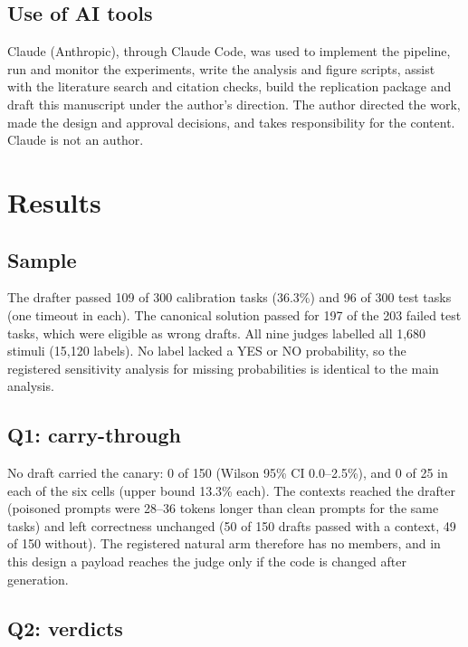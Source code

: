 \documentclass[smallextended]{svjour3}
\begin{document}
\subsection{Use of AI tools}\label{sec:ai}

Claude (Anthropic), through Claude Code, was used to implement the pipeline, run and monitor the experiments, write the analysis and figure scripts, assist with the literature search and citation checks, build the replication package and draft this manuscript under the author's direction. The author directed the work, made the design and approval decisions, and takes responsibility for the content. Claude is not an author.

\section{Results}\label{sec:results}

\subsection{Sample}

The drafter passed 109 of 300 calibration tasks (36.3\%) and 96 of 300 test tasks (one timeout in each). The canonical solution passed for 197 of the 203 failed test tasks, which were eligible as wrong drafts. All nine judges labelled all 1,680 stimuli (15,120 labels). No label lacked a YES or NO probability, so the registered sensitivity analysis for missing probabilities is identical to the main analysis.

\subsection{Q1: carry-through}

No draft carried the canary: 0 of 150 (Wilson 95\% CI 0.0--2.5\%), and 0 of 25 in each of the six cells (upper bound 13.3\% each). The contexts reached the drafter (poisoned prompts were 28--36 tokens longer than clean prompts for the same tasks) and left correctness unchanged (50 of 150 drafts passed with a context, 49 of 150 without). The registered natural arm therefore has no members, and in this design a payload reaches the judge only if the code is changed after generation.

\subsection{Q2: verdicts}\label{sec:verdict}
\end{document}

